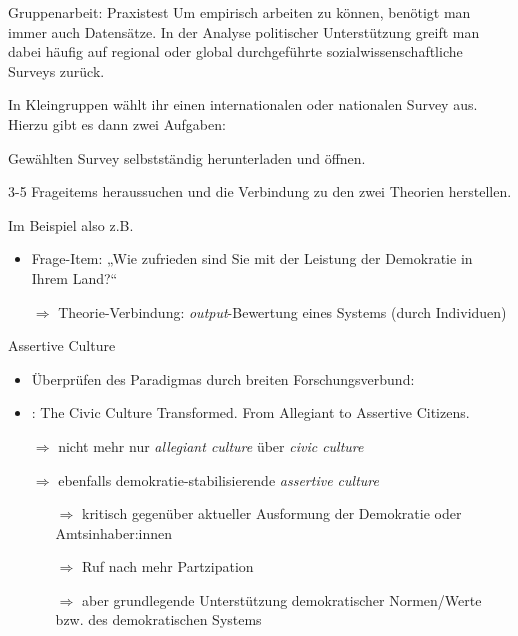 \documentclass[11pt]{beamer}
\begin{document}
\begin{frame}[t]{Gruppenarbeit: Praxistest}
Um empirisch arbeiten zu können, benötigt man immer auch Datensätze. In der Analyse politischer Unterstützung greift man dabei häufig auf regional oder global durchgeführte sozialwissenschaftliche Surveys zurück. \pause

In Kleingruppen wählt ihr einen internationalen oder nationalen Survey aus. Hierzu gibt es dann zwei Aufgaben: 
\begin{nolist}
	\item Gewählten Survey selbstständig herunterladen und öffnen.
	\item 3-5 Frageitems heraussuchen und die Verbindung zu den zwei Theorien herstellen. \pause
\end{nolist}

Im Beispiel also z.B. 
\begin{itemize}
	\item Frage-Item: „Wie zufrieden sind Sie mit der Leistung der Demokratie in Ihrem Land?“
	\item[$\Rightarrow$] Theorie-Verbindung: \textit{output}-Bewertung eines Systems (durch Individuen)
\end{itemize}

\end{frame}



\begin{frame}[t]{Assertive Culture}
\begin{itemize}
	\item Überprüfen des Paradigmas durch breiten Forschungsverbund:
	\item \cite{Dalton2014b}: The Civic Culture Transformed. From Allegiant to Assertive Citizens. \pause
	\item[$\Rightarrow$] nicht mehr nur \textit{allegiant culture} über \textit{civic culture} \pause
	\item[$\Rightarrow$] ebenfalls demokratie-stabilisierende \textit{assertive culture} \pause
	\begin{itemize}
		\item[$\Rightarrow$] kritisch gegenüber aktueller Ausformung der Demokratie oder Amtsinhaber:innen 
		\item[$\Rightarrow$] Ruf nach mehr Partzipation
		\item[$\Rightarrow$] aber grundlegende Unterstützung demokratischer Normen/Werte bzw. des demokratischen Systems 
	\end{itemize}
\end{itemize}
\end{frame}
\end{document}

